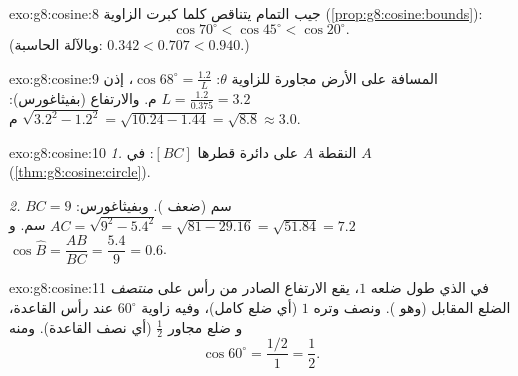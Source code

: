 \begin{solution}{exo:g8:cosine:8}
جيب التمام يتناقص كلما كبرت الزاوية
(\cref{prop:g8:cosine:bounds}):
\[
\cos 70^\circ < \cos 45^\circ < \cos 20^\circ .
\]
(وبالآلة الحاسبة: $0.342 < 0.707 < 0.940$.)
\end{solution}

\begin{solution}{exo:g8:cosine:9}
المسافة على الأرض مجاورة للزاوية $\theta$:
$\cos 68^\circ = \frac{1.2}{L}$، إذن
$L = \frac{1.2}{0.375} = 3.2$ م. والارتفاع (بفيثاغورس):
$\sqrt{3.2^2 - 1.2^2} = \sqrt{10.24 - 1.44} = \sqrt{8.8} \approx 3.0$
م.
\end{solution}

\begin{solution}{exo:g8:cosine:10}
\emph{1.} النقطة $A$ على دائرة قطرها $[BC]$:  في $A$
(\cref{thm:g8:cosine:circle}).

\emph{2.} $BC = 9$ سم (ضعف ). وبفيثاغورس:
$AC = \sqrt{9^2 - 5.4^2} = \sqrt{81 - 29.16} = \sqrt{51.84} = 7.2$
سم. و $\cos\widehat B = \dfrac{AB}{BC} = \dfrac{5.4}{9} = 0.6$.
\end{solution}

\begin{solution}{exo:g8:cosine:11}
في  الذي طول ضلعه $1$، يقع الارتفاع الصادر من رأس
على \emph{منتصف} الضلع المقابل (وهو ). ونصف  وتره $1$
(أي ضلع كامل)، وفيه زاوية $60^\circ$ عند رأس القاعدة، و
ضلع مجاور $\frac12$ (أي نصف القاعدة). ومنه
\[
\cos 60^\circ = \frac{1/2}{1} = \frac12 .
\]
\end{solution}

